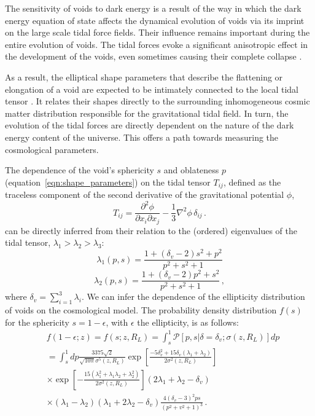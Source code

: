 The sensitivity of voids to dark energy is a result of the way in which the dark energy equation of 
state affects the dynamical evolution of voids via its imprint on the large scale tidal force fields. 
Their influence remains important during the entire evolution of voids. The tidal forces evoke a 
significant anisotropic effect in the development of the voids, even sometimes causing their complete 
collapse \citep{sheth04}. 

As a result, the elliptical shape parameters that describe the flattening or elongation of a void are expected 
to be intimately connected to the local tidal tensor
\citep[see equations~\ref{eqn:tideig1} \& \ref{eqn:tideig2} and][]{bond96, parklee07, platen08}.
It relates their 
shapes directly to the surrounding inhomogeneous cosmic matter distribution responsible for the gravitational tidal 
field. In turn, the evolution of the tidal forces are directly dependent on the nature of the dark energy content 
of the universe.
This offers a path towards measuring the cosmological parameters. 

The dependence of the void's sphericity $s$ and oblateness $p$ (equation~\ref{eqn:shape_parameters}) on the tidal tensor $T_{ij}$, defined as the traceless 
component of the second derivative of the gravitational potential $\phi$,
\begin{equation}
T_{ij} = \frac{\partial^2\phi}{\partial x_i\partial x_j} - \frac{1}{3}\nabla^2\phi\,\delta_{ij} \,.
\label{eqn:tide}
\end{equation}
can be directly inferred from their relation to the (ordered) eigenvalues of the tidal tensor,  
$\lambda_1 > \lambda_2 > \lambda_3$:
\begin{equation}
\lambda_1(p,s) = \frac{1+(\delta_v-2)s^2 + p^2}{p^2 + s^2 +1}
\label{eqn:tideig1}
\end{equation}
\begin{equation}
\lambda_2(p,s) = \frac{1+(\delta_v-2)p^2 + s^2}{p^2 + s^2 +1} \,,
\label{eqn:tideig2}
\end{equation}
where $\delta_v = \sum_{i=1}^3\lambda_i$. We can infer the dependence of the ellipticity distribution of voids on the cosmological model. 
The probability density distribution $f(s)$ for the sphericity $s = 1 - \epsilon$, with $\epsilon$ the ellipticity, is as follows:
\begin{equation}
\label{eqn:parkleeProb}
\begin{split}
&f(1-\epsilon; z) = f(s; z, R_L) = \int_s^1 \mathcal{P}[p,s|\delta=\delta_v; \sigma(z, R_L)]dp \\
&= \int_s^1 dp \frac{3375\sqrt{2}}{\sqrt{10\pi}\sigma^5(z,R_L)}\exp\left[ \frac{-5\delta_v^2 + 15\delta_v(\lambda_1+\lambda_2)}{2\sigma^2(z,R_L)} \right] \\
& \times \exp\left[ -\frac{15(\lambda_1^2+\lambda_1\lambda_2 + \lambda_2^2)}{2\sigma^2(z,R_L)} \right](2\lambda_1+\lambda_2 - \delta_v)\\
& \times (\lambda_1 - \lambda_2) (\lambda_1 + 2\lambda_2 - \delta_v) \frac{4(\delta_v - 3)^2ps}{(p^2 + v^2 +1)^3}  \,.
\end{split}
\end{equation}

